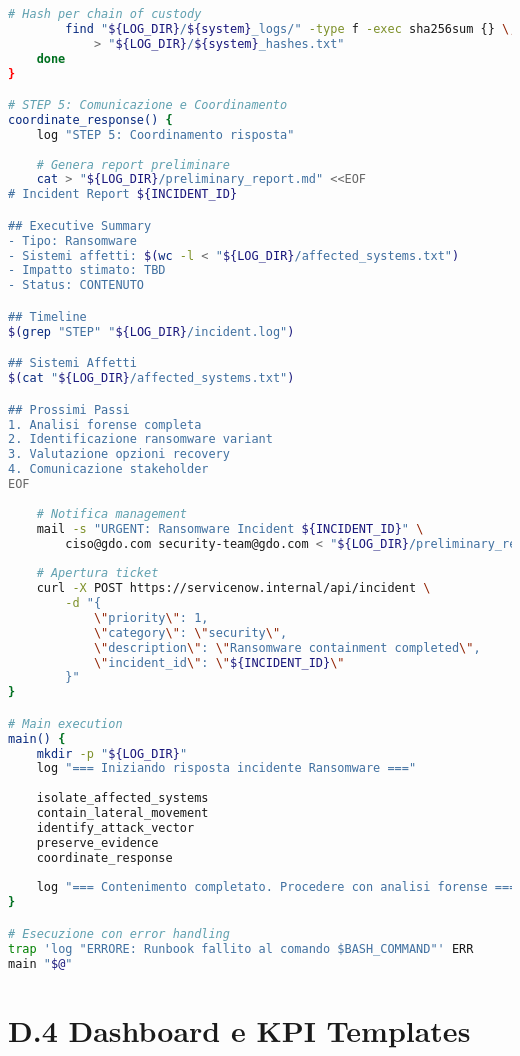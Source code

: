 \begin{lstlisting}[language=bash, caption=Runbook automatizzato per contenimento ransomware]
        # Hash per chain of custody
        find "${LOG_DIR}/${system}_logs/" -type f -exec sha256sum {} \; \
            > "${LOG_DIR}/${system}_hashes.txt"
    done
}

# STEP 5: Comunicazione e Coordinamento
coordinate_response() {
    log "STEP 5: Coordinamento risposta"
    
    # Genera report preliminare
    cat > "${LOG_DIR}/preliminary_report.md" <<EOF
# Incident Report ${INCIDENT_ID}

## Executive Summary
- Tipo: Ransomware
- Sistemi affetti: $(wc -l < "${LOG_DIR}/affected_systems.txt")
- Impatto stimato: TBD
- Status: CONTENUTO

## Timeline
$(grep "STEP" "${LOG_DIR}/incident.log")

## Sistemi Affetti
$(cat "${LOG_DIR}/affected_systems.txt")

## Prossimi Passi
1. Analisi forense completa
2. Identificazione ransomware variant
3. Valutazione opzioni recovery
4. Comunicazione stakeholder
EOF
    
    # Notifica management
    mail -s "URGENT: Ransomware Incident ${INCIDENT_ID}" \
        ciso@gdo.com security-team@gdo.com < "${LOG_DIR}/preliminary_report.md"
    
    # Apertura ticket
    curl -X POST https://servicenow.internal/api/incident \
        -d "{
            \"priority\": 1,
            \"category\": \"security\",
            \"description\": \"Ransomware containment completed\",
            \"incident_id\": \"${INCIDENT_ID}\"
        }"
}

# Main execution
main() {
    mkdir -p "${LOG_DIR}"
    log "=== Iniziando risposta incidente Ransomware ==="
    
    isolate_affected_systems
    contain_lateral_movement
    identify_attack_vector
    preserve_evidence
    coordinate_response
    
    log "=== Contenimento completato. Procedere con analisi forense ==="
}

# Esecuzione con error handling
trap 'log "ERRORE: Runbook fallito al comando $BASH_COMMAND"' ERR
main "$@"
\end{lstlisting}

\section{D.4 Dashboard e KPI Templates}

